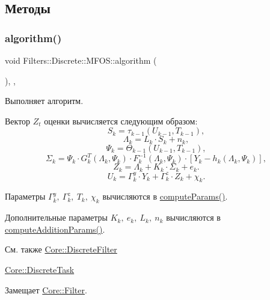 \subsection{Методы}
\hypertarget{class_filters_1_1_discrete_1_1_m_f_o_s_a88e35ad4500d57e81be035959ab9bb5c}{}\label{class_filters_1_1_discrete_1_1_m_f_o_s_a88e35ad4500d57e81be035959ab9bb5c} 
\subsubsection{\texorpdfstring{algorithm()}{algorithm()}}
{\footnotesize\ttfamily void Filters\+::\+Discrete\+::\+M\+F\+O\+S\+::algorithm (\begin{DoxyParamCaption}{ }\end{DoxyParamCaption})\hspace{0.3cm}{\ttfamily [override]}, {\ttfamily [protected]}, {\ttfamily [virtual]}}



Выполняет алгоритм. 

Вектор $Z_t$ оценки вычисляется следующим образом\+: \[S_{k} = \tau_{k-1}(U_{k-1}, T_{k-1}),\] \[\Lambda_k = L_{k} \cdot S_{k} + n_{k},\] \[\Psi_k = \Theta_{k-1}(U_{k-1}, T_{k-1}),\] \[\Sigma_k = \Psi_k \cdot G_k^T(\Lambda_k, \Psi_k) \cdot F_k^{-1}(\Lambda_k, \Psi_k) \cdot [Y_k - h_k(\Lambda_k, \Psi_k)],\] \[Z_k = \Lambda_k + K_k \cdot \Sigma_k + e_k.\] \[U_k = \Gamma_k^y \cdot Y_k + \Gamma_k^z \cdot Z_k + \chi_k.\]

Параметры $\Gamma_k^y,\ \Gamma_k^z,\ T_k,\ \chi_k$ вычисляются в \hyperlink{class_filters_1_1_discrete_1_1_m_f_o_s_aa8e5e6ebd6325efc56ef40a2d72303be}{compute\+Params()}.

Дополнительные параметры $K_k,\ e_k,\ L_{k},\ n_{k}$ вычисляются в \hyperlink{class_filters_1_1_discrete_1_1_m_f_o_s_a23d5c9a20a5eca3b5fd1355359655409}{compute\+Addition\+Params()}.

\begin{DoxySeeAlso}{См. также}
\hyperlink{class_core_1_1_discrete_filter}{Core\+::\+Discrete\+Filter} 

\hyperlink{class_core_1_1_discrete_task}{Core\+::\+Discrete\+Task} 
\end{DoxySeeAlso}


Замещает \hyperlink{class_core_1_1_filter_a438681ee3e54aba2148042d9f8011ab8}{Core\+::\+Filter}.



